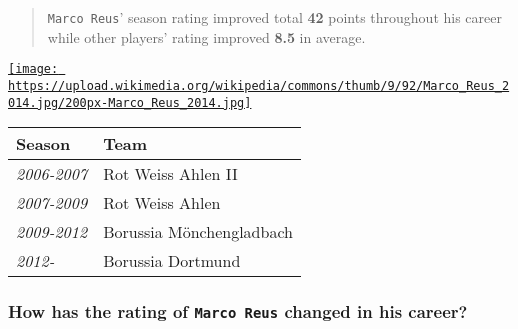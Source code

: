 \documentclass[11pt]{article}
\makeatletter
\def\maxwidth{\ifdim\Gin@nat@width>\linewidth\linewidth
    \else\Gin@nat@width\fi}
\let\Oldincludegraphics\includegraphics
\renewcommand{\includegraphics}[1]{\Oldincludegraphics[width=.8\maxwidth]{#1}}
\makeatother
\begin{document}
\begin{quote}
\texttt{Marco\ Reus}' season rating improved total \textbf{42} points
throughout his career while other players' rating improved \textbf{8.5}
in average.
\end{quote}

    \href{https://en.wikipedia.org/wiki/Marco_Reus}{\texttt{[image: https://upload.wikimedia.org/wikipedia/commons/thumb/9/92/Marco\_Reus\_2014.jpg/200px-Marco\_Reus\_2014.jpg]}}

\begin{longtable}[]{@{}ll@{}}
\toprule
Season & Team\tabularnewline
\midrule
\endhead
\emph{2006-2007} & Rot Weiss Ahlen II\tabularnewline
\emph{2007-2009} & Rot Weiss Ahlen\tabularnewline
\emph{2009-2012} & Borussia Mönchengladbach\tabularnewline
\emph{2012-} & Borussia Dortmund\tabularnewline
\bottomrule
\end{longtable}

    \subsubsection{\texorpdfstring{How has the rating of
\texttt{Marco\ Reus} changed in his
career?}{How has the rating of Marco Reus changed in his career?}}\label{how-has-the-rating-of-marco-reus-changed-in-his-career}
\end{document}

